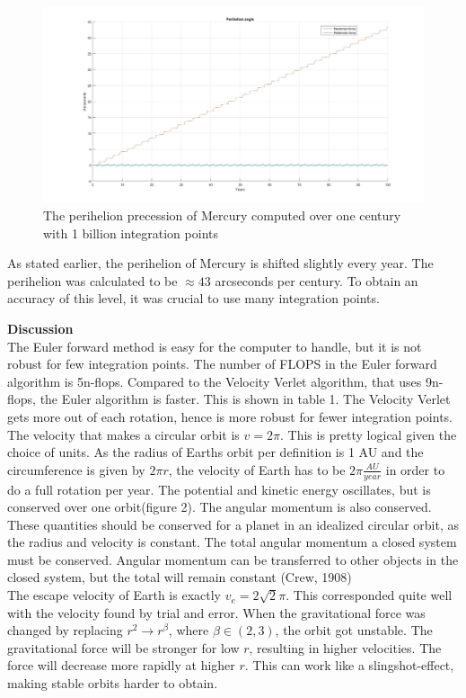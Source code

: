 \documentclass[10pt,a4paper]{article}
\begin{document}
\begin{figure} [H]
\centerline{\includegraphics[scale=0.3]{perihelion.jpg}}
\caption{The perihelion precession of Mercury computed over one century with 1 billion integration points}
\end{figure} 
\noindent As stated earlier, the perihelion of Mercury is shifted slightly every year. The perihelion was calculated to be $\approx 43$ arcseconds per century. To obtain an accuracy of this level, it was crucial to use many integration points.


\newpage
{\LARGE\bf
Discussion
}
\\


\noindent The Euler forward method is easy for the computer to handle, but it is not robust for few integration points. The number of FLOPS in the Euler forward algorithm is 5n-flops. Compared to the Velocity Verlet algorithm, that uses 9n-flops, the Euler algorithm is faster. This is shown in table 1. The Velocity Verlet gets more out of each rotation, hence is more robust for fewer integration points. The velocity that makes a circular orbit is $v=2\pi$. This is pretty logical given the choice of units. As the radius of Earths orbit per definition is 1 AU and the circumference is given by $2\pi r$, the velocity of Earth has to be $2\pi \frac{AU}{year}$ in order to do a full rotation per year. The potential and kinetic energy oscillates, but is conserved over one orbit(figure 2). The angular momentum is also conserved. These quantities should be conserved for a planet in an idealized circular orbit, as the radius and velocity is constant. The total angular momentum a closed system must be conserved. Angular momentum can be transferred to other objects in the closed system, but the total will remain constant (Crew, 1908) \\


\noindent The escape velocity of Earth is exactly $v_e=2\sqrt{2}\pi$. This corresponded quite well with the velocity found by trial and error. When the gravitational force was changed by replacing $r^2\rightarrow r^\beta$, where $\beta \in(2,3)$, the orbit got unstable. The gravitational force will be stronger for low $r$, resulting in higher velocities. The force will decrease more rapidly at higher $r$. This can work like a slingshot-effect, making stable orbits harder to obtain.\\
\end{document}
